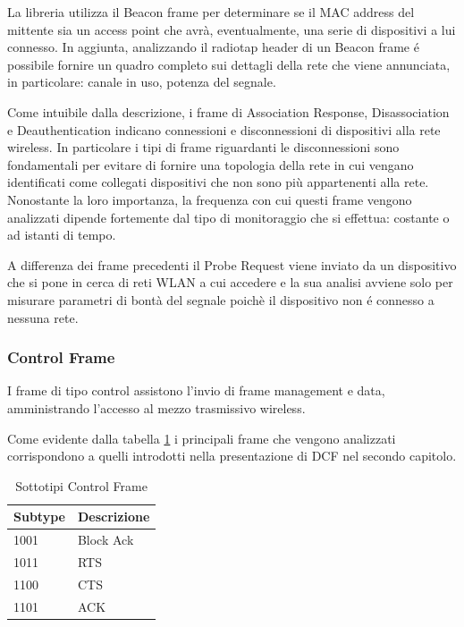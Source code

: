 La libreria utilizza il Beacon frame per determinare se il MAC address del mittente sia  un access point che avr\`a, eventualmente, una serie di dispositivi a lui connesso.
In aggiunta, analizzando il radiotap header di un Beacon frame \'e possibile fornire un quadro completo sui dettagli della rete che viene annunciata, in particolare: canale in uso, potenza del segnale.

Come intuibile dalla descrizione, i frame di Association Response, Disassociation e Deauthentication indicano connessioni e disconnessioni di dispositivi alla rete wireless.
In particolare i tipi di frame riguardanti le disconnessioni sono fondamentali per evitare di fornire una topologia della rete in cui vengano identificati come collegati dispositivi che non sono pi\`u appartenenti alla rete.
Nonostante la loro importanza, la frequenza con cui questi frame vengono analizzati dipende fortemente dal tipo di monitoraggio che si effettua: costante o ad istanti di tempo.

A differenza dei frame precedenti il Probe Request viene inviato da un dispositivo che si pone in cerca di reti WLAN a cui accedere e  la sua analisi avviene solo per misurare parametri di bont\`a del segnale poich\`e il dispositivo non \'e connesso a nessuna rete.

\subsubsection{Control Frame}

I frame di tipo control assistono l'invio di frame management e data, amministrando l'accesso al mezzo trasmissivo wireless.

Come evidente dalla tabella \ref{table:controlframes} i principali frame che vengono analizzati corrispondono a quelli introdotti nella presentazione di DCF nel secondo capitolo.
\begin{table}[h]
\centering
\begin{tabular}{| l | l |}
	\hline
	Subtype  & Descrizione \\ \hline
	1001	 & Block Ack 	\\ \hline
	1011	 & RTS \\ \hline
	1100 &	CTS \\ \hline
	1101	& ACK \\ \hline
\end{tabular}
\centering
\caption{Sottotipi Control Frame}
\label{table:controlframes}
\end{table}

